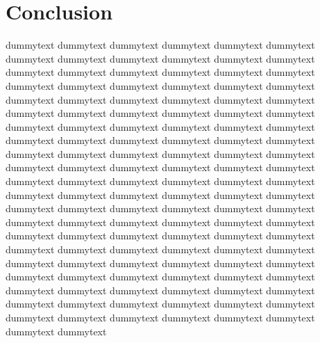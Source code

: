 \documentclass{article}
\begin{document}
\section{Conclusion}

dummytext dummytext dummytext dummytext dummytext dummytext dummytext dummytext dummytext dummytext dummytext dummytext dummytext dummytext dummytext dummytext dummytext dummytext dummytext dummytext dummytext dummytext dummytext dummytext dummytext dummytext dummytext dummytext dummytext dummytext dummytext dummytext dummytext dummytext dummytext dummytext dummytext dummytext dummytext dummytext dummytext dummytext dummytext dummytext dummytext dummytext dummytext dummytext dummytext dummytext dummytext dummytext dummytext dummytext dummytext dummytext dummytext dummytext dummytext dummytext dummytext dummytext dummytext dummytext dummytext dummytext dummytext dummytext dummytext dummytext dummytext dummytext dummytext dummytext dummytext dummytext dummytext dummytext dummytext dummytext dummytext dummytext dummytext dummytext dummytext dummytext dummytext dummytext dummytext dummytext dummytext dummytext dummytext dummytext dummytext dummytext dummytext dummytext dummytext dummytext dummytext dummytext dummytext dummytext dummytext dummytext dummytext dummytext dummytext dummytext dummytext dummytext dummytext dummytext dummytext dummytext dummytext dummytext dummytext dummytext dummytext dummytext dummytext dummytext dummytext dummytext dummytext dummytext


\end{document}
